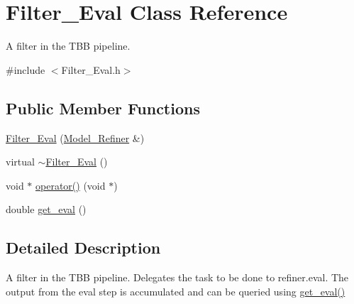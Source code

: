 \hypertarget{class_filter___eval}{
\section{Filter\_\-Eval Class Reference}
\label{class_filter___eval}
}


A filter in the TBB pipeline.  




{\ttfamily \#include $<$Filter\_\-Eval.h$>$}

\subsection*{Public Member Functions}
\begin{DoxyCompactItemize}
\item 
\hyperlink{class_filter___eval_a045ecc48dc003fcf28074ecf9459aecd}{Filter\_\-Eval} (\hyperlink{class_model___refiner}{Model\_\-Refiner} \&)
\item 
virtual \hyperlink{class_filter___eval_a37b840fc1b612ea3814985d5149de219}{$\sim$Filter\_\-Eval} ()
\item 
void $\ast$ \hyperlink{class_filter___eval_aa76e239d1c12bb4d5d0ffd6b4b70bdbc}{operator()} (void $\ast$)
\item 
double \hyperlink{class_filter___eval_afe2256ba9ad738c4ffb23164df38d76a}{get\_\-eval} ()
\end{DoxyCompactItemize}


\subsection{Detailed Description}
A filter in the TBB pipeline. Delegates the task to be done to refiner.eval. The output from the eval step is accumulated and can be queried using \hyperlink{class_filter___eval_afe2256ba9ad738c4ffb23164df38d76a}{get\_\-eval()} 

